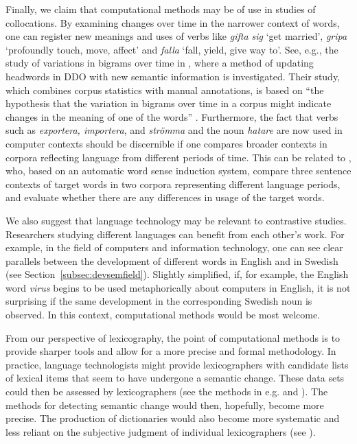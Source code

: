 \documentclass[output=paper]{langscibook}
\begin{document}
Finally, we claim that computational methods may be of use in studies of collocations.  By examining changes over time in the narrower context of words, one can register new meanings and uses of verbs like \emph{gifta sig} `get married', \emph{gripa} `profoundly touch, move, affect' and \emph{falla} `fall, yield, give way to'. See, e.g., the study of variations in bigrams over time in \citet{nimb2020}, where a method of updating headwords in DDO with new semantic information is investigated. Their study, which combines corpus statistics with manual annotations, is based on ``the hypothesis that the variation in bigrams over time in a corpus might indicate changes in the meaning of one of the words'' \citep[112]{nimb2020}. Furthermore, the fact that verbs such as \emph{exportera, importera}, and \emph{strömma} and the noun \emph{hatare} are now used in computer contexts should be discernible if one compares broader contexts in corpora reflecting language from different periods of time. This can be related to \citet{cook13alexicographic}, who, based on an automatic word sense induction system, compare three sentence contexts of target words in two corpora representing different language periods, and evaluate whether there are any differences in usage of the target words.

We also suggest that language technology may be relevant to contrastive studies. Researchers studying different languages can benefit from each other's work. For example, in the field of computers and information technology, one can see clear parallels between the development of different words in English and in Swedish (see Section~\ref{subsec:devsemfield}). Slightly simplified, if, for example, the English word \emph{virus} begins to be used metaphorically about computers in English, it is not surprising if the same development in the corresponding Swedish noun is observed. In this context, computational methods would be most welcome. 

From our perspective of lexicography, the point of computational methods is to provide sharper tools and allow for a more precise and formal methodology. In practice, language technologists might provide lexicographers with candidate lists of lexical items that seem to have undergone a semantic change. These data sets could then be assessed by lexicographers (see the methods in e.g. \citealt{cook13alexicographic} and \citealt{nimb2020}). The methods for detecting semantic change would then, hopefully, become more precise. The production of dictionaries would also become more systematic and less reliant on the subjective judgment of individual lexicographers (see \citealt[50]{cook13alexicographic}).
 
\end{document}
